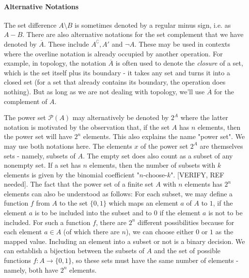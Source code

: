 
\paragraph{Alternative Notations}

The set difference $A \setminus B$ is sometimes denoted by a regular minus sign, i.e. as $A - B$. There are also alternative notations for the set complement that we have denoted by $\overline{A}$. These include $A^\complement, A'$ and $\neg A$. These may be used in contexts where the overline notation is already occupied by another operation. For example, in topology, the notation $\overline{A}$ is often used to denote the \emph{closure} of a set, which is the set itself plus its boundary - it takes any set and turns it into a closed set (for a set that already contains its boundary, the operation does nothing). But as long as we are not dealing with topology, we'll use $\overline{A}$ for the complement of $A$.



\medskip
The power set $\mathcal{P}(A)$ may alternatively be denoted by $2^A$ where the latter notation is motivated by the observation that, if the set $A$ has $n$ elements, then the power set will have $2^n$ elements. This also explains the name "power set". We may use both notations here. The elements $x$ of the power set $2^A$ are themselves sets - namely, subsets of $A$. The empty set does also count as a subset of any nonempty set. If a set has $n$ elements, then the number of subsets with $k$ elements is given by the binomial coefficient "$n$-choose-$k$". [VERIFY, REF needed]. The fact that the power set of a finite set $A$ with $n$ elements has $2^n$ elements can also be understood as follows: For each subset, we may define a function $f$ from $A$ to the set $\{0,1\}$ which maps an element $a$ of $A$ to $1$, if the element $a$ is to be included into the subset and to $0$ if the element $a$ is not to be included. For such a function $f$, there are $2^n$ different possibilities because for each element $a \in A$ (of which there are $n$), we can choose either $0$ or $1$ as the mapped value. Including an element into a subset or not is a binary decision. We can establish a bijection between the subsets of $A$ and the set of possible functions $f: A \rightarrow \{0,1\}$, so these sets must have the same number of elements - namely, both have $2^n$ elements.

